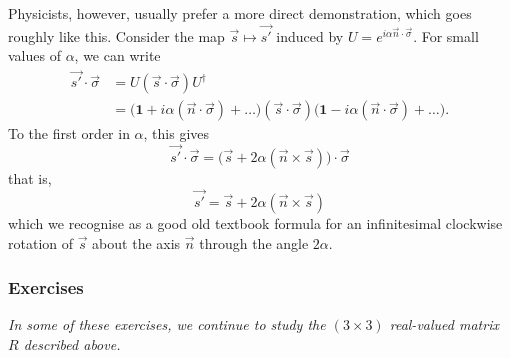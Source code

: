 \documentclass[fleqn]{article}
\begin{document}
Physicists, however, usually prefer a more direct demonstration, which goes roughly like this.
Consider the map \(\vec{s} \mapsto \vec{s'}\) induced by \(U=e^{i \alpha \vec{n}\cdot\vec{\sigma}}\).
For small values of \(\alpha\), we can write
\[
  \begin{aligned}
    \vec{s'}\cdot\vec{\sigma}
    &= U(\vec{s}\cdot\vec{\sigma}) U^\dagger
  \\&= \Big(
      \mathbf{1}+i\alpha (\vec{n}\cdot\vec{\sigma})+\ldots
    \Big)
    (\vec{s}\cdot\vec{\sigma}) 
    \Big(
      \mathbf{1}- i\alpha(\vec{n}\cdot\vec{\sigma})+\ldots
    \Big).
  \end{aligned}
\]
To the first order in \(\alpha\), this gives
\[
  \vec{s'} \cdot\vec{\sigma}
  = \Big(
    \vec{s} + 2\alpha (\vec{n}\times\vec{s})
  \Big)
  \cdot \vec{\sigma}
\]
that is,
\[
  \vec{s'} =
  \vec{s} + 2\alpha(\vec{n}\times\vec{s})
\]
which we recognise as a good old textbook formula for an infinitesimal clockwise rotation of \(\vec{s}\) about the axis \(\vec{n}\) through the angle \(2\alpha\).

\hypertarget{exercises-3}{%
\subsubsection{Exercises}\label{exercises-3}}

\emph{In some of these exercises, we continue to study the \((3\times 3)\) real-valued matrix \(R\) described above.}
\end{document}
